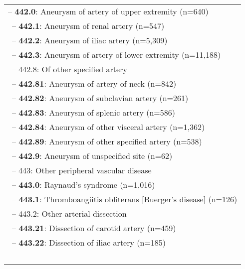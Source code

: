 \begin{longtable}{p{\textwidth}}
\hspace{30pt}\footnotesize{-- {\color{ForestGreen} \textbf{442.0}}: Aneurysm of artery of upper extremity (n=640)} \\ \-\ \hspace{30pt}\footnotesize{-- {\color{ForestGreen} \textbf{442.1}}: Aneurysm of renal artery (n=547)} \\ \-\ \hspace{30pt}\footnotesize{-- {\color{ForestGreen} \textbf{442.2}}: Aneurysm of iliac artery (n=5,309)} \\ \-\ \hspace{30pt}\footnotesize{-- {\color{ForestGreen} \textbf{442.3}}: Aneurysm of artery of lower extremity (n=11,188)} \\ \-\ \hspace{30pt}\footnotesize{-- 442.8: Of other specified artery} \\ \-\ \hspace{40pt}\footnotesize{-- {\color{ForestGreen} \textbf{442.81}}: Aneurysm of artery of neck (n=842)} \\ \-\ \hspace{40pt}\footnotesize{-- {\color{ForestGreen} \textbf{442.82}}: Aneurysm of subclavian artery (n=261)} \\ \-\ \hspace{40pt}\footnotesize{-- {\color{ForestGreen} \textbf{442.83}}: Aneurysm of splenic artery (n=586)} \\ \-\ \hspace{40pt}\footnotesize{-- {\color{ForestGreen} \textbf{442.84}}: Aneurysm of other visceral artery (n=1,362)} \\ \-\ \hspace{40pt}\footnotesize{-- {\color{ForestGreen} \textbf{442.89}}: Aneurysm of other specified artery (n=538)} \\ \-\ \hspace{30pt}\footnotesize{-- {\color{ForestGreen} \textbf{442.9}}: Aneurysm of unspecified site (n=62)} \\ \-\ \hspace{20pt}\footnotesize{-- 443: Other peripheral vascular disease} \\ \-\ \hspace{30pt}\footnotesize{-- {\color{ForestGreen} \textbf{443.0}}: Raynaud's syndrome (n=1,016)} \\ \-\ \hspace{30pt}\footnotesize{-- {\color{ForestGreen} \textbf{443.1}}: Thromboangiitis obliterans [Buerger's disease] (n=126)} \\ \-\ \hspace{30pt}\footnotesize{-- 443.2: Other arterial dissection} \\ \-\ \hspace{40pt}\footnotesize{-- {\color{ForestGreen} \textbf{443.21}}: Dissection of carotid artery (n=459)} \\ \-\ \hspace{40pt}\footnotesize{-- {\color{ForestGreen} \textbf{443.22}}: Dissection of iliac artery (n=185)} \\ \-\ 
\end{longtable}
